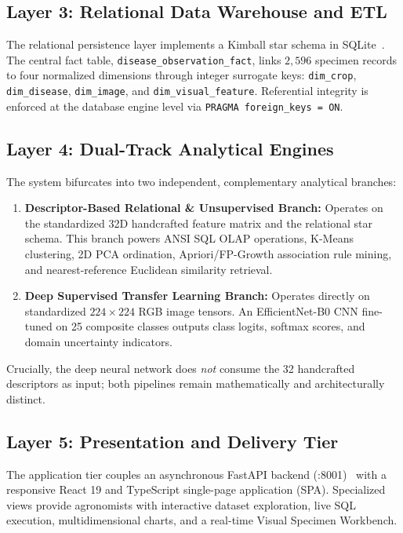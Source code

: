 \documentclass[conference,a4paper]{IEEEtran}
\begin{document}
\subsection{Layer 3: Relational Data Warehouse and ETL}
The relational persistence layer implements a Kimball star schema in SQLite~\cite{kimball2013datawarehouse}. The central fact table, \texttt{disease\_observation\_fact}, links $2,596$ specimen records to four normalized dimensions through integer surrogate keys: \texttt{dim\_crop}, \texttt{dim\_disease}, \texttt{dim\_image}, and \texttt{dim\_visual\_feature}. Referential integrity is enforced at the database engine level via \texttt{PRAGMA foreign\_keys = ON}.

\subsection{Layer 4: Dual-Track Analytical Engines}
The system bifurcates into two independent, complementary analytical branches:
\begin{enumerate}
    \item \textbf{Descriptor-Based Relational \& Unsupervised Branch:} Operates on the standardized 32D handcrafted feature matrix and the relational star schema. This branch powers ANSI SQL OLAP operations, K-Means clustering, 2D PCA ordination, Apriori/FP-Growth association rule mining, and nearest-reference Euclidean similarity retrieval.
    \item \textbf{Deep Supervised Transfer Learning Branch:} Operates directly on standardized $224\times 224$ RGB image tensors. An EfficientNet-B0 CNN fine-tuned on 25 composite classes outputs class logits, softmax scores, and domain uncertainty indicators.
\end{enumerate}
Crucially, the deep neural network does \textit{not} consume the 32 handcrafted descriptors as input; both pipelines remain mathematically and architecturally distinct.

\subsection{Layer 5: Presentation and Delivery Tier}
The application tier couples an asynchronous FastAPI backend (:8001)~\cite{ramirez2018fastapi} with a responsive React 19 and TypeScript single-page application (SPA). Specialized views provide agronomists with interactive dataset exploration, live SQL execution, multidimensional charts, and a real-time Visual Specimen Workbench.
\end{document}
